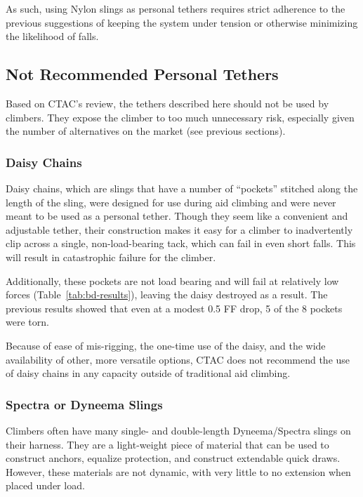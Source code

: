 \documentclass[nonacm,acmtog]{acmart}
\begin{document}
   As such, using Nylon slings as personal tethers requires strict adherence to
   the previous suggestions of keeping the system under tension or otherwise
   minimizing the likelihood of falls.

\subsection{Not Recommended Personal Tethers}
\label{sec:notrecommended}

   Based on CTAC's review, the tethers described here should not be used by
   climbers.  They expose the climber to too much unnecessary risk, especially
   given the number of alternatives on the market (see previous sections).

\subsubsection{Daisy Chains}

   Daisy chains, which are slings that have a number of ``pockets'' stitched
   along the length of the sling, were designed for use during aid climbing and
   were never meant to be used as a personal tether.  Though they seem like a
   convenient and adjustable tether, their construction makes it easy for a
   climber to inadvertently clip across a single, non-load-bearing tack, which
   can fail in even short falls.  This will result in catastrophic failure for
   the climber.

   Additionally, these pockets are not load bearing and will fail at relatively
   low forces (Table~\ref{tab:bd-results}), leaving the daisy destroyed as a
   result.  The previous results showed that even at a modest 0.5 FF drop, 5 of
   the 8 pockets were torn.

   Because of ease of mis-rigging, the one-time use of the daisy, and the wide
   availability of other, more versatile options, CTAC does not recommend the
   use of daisy chains in any capacity outside of traditional aid climbing.

\subsubsection{Spectra or Dyneema Slings}

   Climbers often have many single- and double-length Dyneema/Spectra slings on
   their harness.  They are a light-weight piece of material that can be used to
   construct anchors, equalize protection, and construct extendable quick draws.
   However, these materials are not dynamic, with very little to no extension
   when placed under load.
\end{document}
